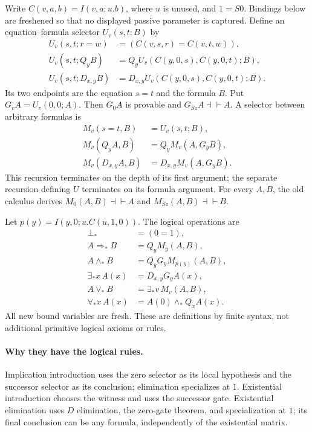 \documentclass[11pt,a4paper]{article}
\theoremstyle{definition}\newtheorem{definition}[theorem]{Definition}
\newcommand{\eqv}{\dashv\vdash}
\begin{document}
Write $C(v,a,b)=I(v,a;u.b)$, where $u$ is unused, and $1=S0$.
Bindings below are freshened so that no displayed passive parameter is
captured. Define an equation--formula selector $U_v(s,t;B)$ by
\[
\begin{aligned}
U_v(s,t;r=w)&=(C(v,s,r)=C(v,t,w)),\\
U_v(s,t;Q_y B)&=Q_y U_v(C(y,0,s),C(y,0,t);B),\\
U_v(s,t;D_{x,y} B)&=D_{x,y}U_v(C(y,0,s),C(y,0,t);B).
\end{aligned}
\]
Its two endpoints are the equation $s=t$ and the formula $B$.
Put $G_v A=U_v(0,0;A)$. Then $G_0 A$ is provable and
$G_{Sz}A\eqv A$. A selector between arbitrary formulas is
\[
\begin{aligned}
M_v(s=t,B)&=U_v(s,t;B),\\
M_v(Q_y A,B)&=Q_y M_v(A,G_yB),\\
M_v(D_{x,y} A,B)&=D_{x,y}M_v(A,G_yB).
\end{aligned}
\]
This recursion terminates on the depth of its first argument; the
separate recursion defining $U$ terminates on its formula argument.
For every $A,B$, the old calculus derives
$M_0(A,B)\eqv A$ and $M_{Sz}(A,B)\eqv B$.

Let $p(y)=I(y,0;u.C(u,1,0))$. The logical operations are
\[
\begin{aligned}
\bot_*&=(0=1),\\
A\Rightarrow_* B&=Q_y M_y(A,B),\\
A\wedge_* B&=Q_y G_y M_{p(y)}(A,B),\\
\exists_* x\,A(x)&=D_{x,y}G_y A(x),\\
A\vee_*B&=\exists_*v\,M_v(A,B),\\
\forall_*x\,A(x)&=A(0)\wedge_* Q_x A(x).
\end{aligned}
\]
All new bound variables are fresh. These are definitions by finite
syntax, not additional primitive logical axioms or rules.

\paragraph{Why they have the logical rules.}
Implication introduction uses the zero selector as its local hypothesis
and the successor selector as its conclusion; elimination specializes
at $1$. Existential introduction chooses the witness and uses the
successor gate. Existential elimination uses $D$ elimination, the
zero-gate theorem, and specialization at $1$; its final conclusion can
be any formula, independently of the existential matrix.
\end{document}
